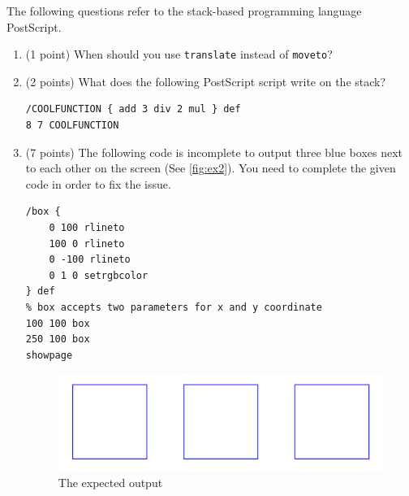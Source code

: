 The following questions refer to the stack-based programming language PostScript.
\begin{enumerate}


\item (1 point) When should you use \texttt{translate} instead of \texttt{moveto}?
\vspace{5cm}

\item (2 points) What does the following PostScript script write on the stack?
\begin{verbatim}
/COOLFUNCTION { add 3 div 2 mul } def
8 7 COOLFUNCTION
\end{verbatim}
\vspace{5cm}

\newpage

\item (7 points) The following code is incomplete to output three blue boxes next to each other on the screen (See \autoref{fig:ex2}). You need to complete the given code in order to fix the issue.
\begin{verbatim}
/box {			
	0 100 rlineto
	100 0 rlineto
	0 -100 rlineto
	0 1 0 setrgbcolor
} def
% box accepts two parameters for x and y coordinate
100 100 box
250 100 box
showpage
\end{verbatim}

\begin{figure}[h!]
\begin{center}
\includegraphics[width=0.4\columnwidth]{images/box.png}
\caption{The expected output}
\label{fig:ex2}
\end{center}
\end{figure}

\newpage

\vspace{5cm}


\end{enumerate}